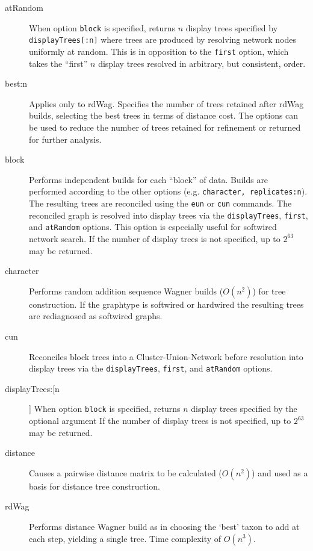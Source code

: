 	\begin{description}
		\item [atRandom] When option \texttt{block} is specified, returns $n$ display trees specified by 
		\texttt{displayTrees[:n]} where trees are produced by resolving network nodes uniformly at random. 
		This is in opposition to the \texttt{first} option, which takes the ``first'' $n$ display trees resolved 
		in arbitrary, but consistent, order.

		\item [best:n] Applies only to rdWag. Specifies the number of trees retained after rdWag builds, 
		selecting the best trees in terms of distance cost. The options can be used to reduce
		the number of trees retained for refinement or returned for further analysis. 

		\item[block] Performs independent builds for each ``block'' of data. Builds are performed according 
		to the other options (e.g. \texttt{character, replicates:n}). The resulting trees are reconciled using the 
		\texttt{eun} or \texttt{cun} commands. The reconciled graph is resolved into display trees via the 
		\texttt{displayTrees}, \texttt{first}, and \texttt{atRandom} options. This option is especially useful 
		for softwired network search. If the number of display trees is not specified, up to $2^{63}$ may be 
		returned.

		\item [character] Performs random addition sequence Wagner \citep{Farris1970} builds ($O(n^2)$) 
		for tree construction. If the graphtype is softwired or hardwired the resulting trees are rediagnosed 
		as softwired graphs.
		
		\item [cun] Reconciles block trees into a Cluster-Union-Network \citep{Baroni2005} before resolution 
		into display trees via the \texttt{displayTrees}, \texttt{first}, 	and \texttt{atRandom} options.

		\item [displayTrees:[n]] When option \texttt{block} is specified, returns $n$ display trees specified 
		by the optional argument If the number of display trees is not specified, up to $2^{63}$ may be returned.

		\item [distance] Causes a pairwise distance matrix to be calculated ($O(n^2)$) and used as a basis 
		for distance tree construction.
		
		\item [rdWag] Performs distance Wagner build as in \citep{Farris1972} choosing the `best' taxon to 
		add at each step, yielding a single tree. Time complexity of $O(n^3)$.
		

\end{description}

